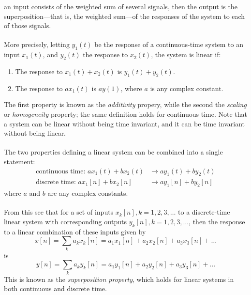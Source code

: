 \documentclass{report}
\begin{document}
an input consists of the weighted sum of several signals, then the output is the superposition---that is, the weighted sum---of
the responses of the system to each of those signals.\\
\vspace{1mm}\\
More precisely, letting $y_1(t)$ be the response of a continuous-time system to an input $x_1(t)$, 
and $y_2(t)$ the response to $x_2(t)$, the system is linear if:
\begin{enumerate}
\item The response to $x_1(t)+x_2(t)$ is $y_1(t)+y_2(t)$.
\item The response to $ax_1(t)$ is $ay(1)$, where $a$ is any complex constant.
\end{enumerate}
The first property is known as the \textit{additivity} propery, while the second the \textit{scaling} or \textit{homogeneity} 
property; the same definition holds for continuous time.
Note that a system can be linear without being time invariant, and it can be time invariant without being linear.\\
\vspace{1mm}\\
The two properties defining a linear system can be combined into a single statement:
\begin{align*}
\text{continuous time: }ax_1(t)+bx_2(t)&\to ay_1(t)+by_2(t)\\
\text{discrete time: }ax_1[n]+bx_2[n]&\to ay_1[n]+by_2[n]
\end{align*}
where $a$ and $b$ are any complex constants.\\
\vspace{1mm}\\
From this see that for a set of inputs $x_k[n],k=1,2,3,\ldots$ to a discrete-time linear system with corresponding outputs 
$y_k[n],k=1,2,3,\ldots$, then the response to a linear combination of these inputs given by 
\begin{equation*}
x[n]=\sum_ka_kx_k[n]=a_1x_1[n]+a_2x_2[n]+a_3x_3[n]+\ldots
\end{equation*}
is
\begin{equation*}
y[n]=\sum_ka_ky_k[n]=a_1y_1[n]+a_2y_2[n]+a_3y_3[n]+\ldots
\end{equation*}
This is known as the \textit{superposition property}, which holds for linear systems in both continuous and discrete time.\\
\vspace{1mm}\\
\end{document}
